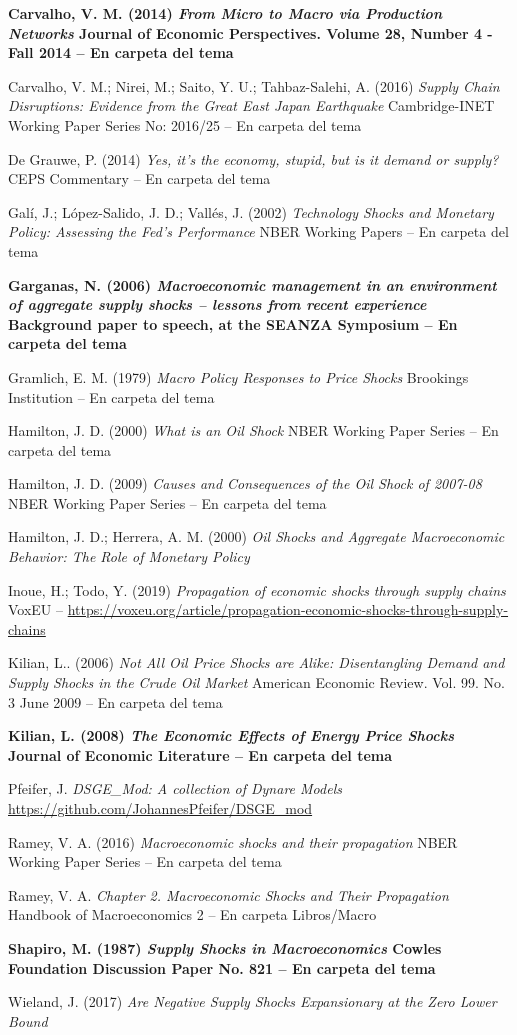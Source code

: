 \documentclass{nuevotema}
\begin{document}
\textbf{Carvalho, V. M. (2014) \textit{From Micro to Macro via Production Networks} Journal of Economic Perspectives. Volume 28, Number 4 - Fall 2014 -- En carpeta del tema}

Carvalho, V. M.; Nirei, M.; Saito, Y. U.; Tahbaz-Salehi, A. (2016) \textit{Supply Chain Disruptions: Evidence from the Great East Japan Earthquake} Cambridge-INET Working Paper Series No: 2016/25 -- En carpeta del tema

De Grauwe, P. (2014) \textit{Yes, it's the economy, stupid, but is it demand or supply?} CEPS Commentary -- En carpeta del tema

Galí, J.; López-Salido, J. D.; Vallés, J. (2002) \textit{Technology Shocks and Monetary Policy: Assessing the Fed's Performance} NBER Working Papers -- En carpeta del tema

\textbf{Garganas, N. (2006) \textit{Macroeconomic management in an environment of aggregate supply shocks -- lessons from recent experience} Background paper to speech, at the SEANZA Symposium -- En carpeta del tema}

Gramlich, E. M. (1979) \textit{Macro Policy Responses to Price Shocks} Brookings Institution -- En carpeta del tema

Hamilton, J. D. (2000) \textit{What is an Oil Shock} NBER Working Paper Series -- En carpeta del tema

Hamilton, J. D. (2009) \textit{Causes and Consequences of the Oil Shock of 2007-08} NBER Working Paper Series -- En carpeta del tema

Hamilton, J. D.; Herrera, A. M. (2000) \textit{Oil Shocks and Aggregate Macroeconomic Behavior: The Role of Monetary Policy} 

Inoue, H.; Todo, Y. (2019) \textit{Propagation of economic shocks through supply chains} VoxEU -- \url{https://voxeu.org/article/propagation-economic-shocks-through-supply-chains}

Kilian, L.. (2006) \textit{Not All Oil Price Shocks are Alike: Disentangling Demand and Supply Shocks in the Crude Oil Market} American Economic Review. Vol. 99. No. 3 June 2009 -- En carpeta del tema

\textbf{Kilian, L. (2008) \textit{The Economic Effects of Energy Price Shocks} Journal of Economic Literature -- En carpeta del tema}

Pfeifer, J. \textit{DSGE\_Mod: A collection of Dynare Models} \url{https://github.com/JohannesPfeifer/DSGE_mod}

Ramey, V. A. (2016) \textit{Macroeconomic shocks and their propagation}  NBER Working Paper Series -- En carpeta del tema

Ramey, V. A. \textit{Chapter 2. Macroeconomic Shocks and Their Propagation} Handbook of Macroeconomics 2 -- En carpeta Libros/Macro

\textbf{Shapiro, M. (1987) \textit{Supply Shocks in Macroeconomics} Cowles Foundation Discussion Paper No. 821 -- En carpeta del tema}

Wieland, J. (2017) \textit{Are Negative Supply Shocks Expansionary at the Zero Lower Bound} 
\end{document}
